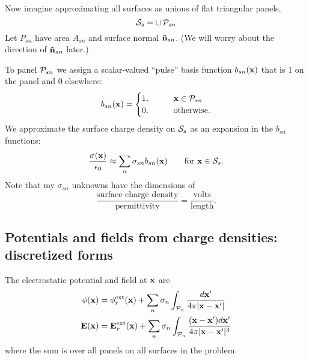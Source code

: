 \documentclass[letterpaper]{article}
\begin{document}
Now imagine approximating all surfaces as unions 
of flat triangular panels, 
$$ \mathcal{S}_{s} = \cup \, \mathcal{P}_{sn}$$
Let $P_{sn}$ have area $A_{sn}$ and surface normal
$\mathbf{\hat n}_{sn}$. (We will worry about the direction
of $\mathbf{\hat n}_{sn}$ later.)

To panel $\mathcal{P}_{sn}$ we assign a scalar-valued 
``pulse'' basis function $b_{sn}(\mathbf{x})$ that is 
1 on the panel and 0 elsewhere:
$$ b_{sn}(\mathbf{x}) = 
   \begin{cases}
    1, \qquad &\mathbf{x} \in \mathcal{P}_{sn} \\
    0, \qquad &\text{otherwise}.
  \end{cases}
$$
We approximate the surface charge density on $\mathcal{S}_s$
as an expansion in the $b_{sn}$ functions:
$$ \frac{\sigma(\mathbf{x})}{\epsilon_0} 
   \approx \sum_n \sigma_{sn} b_{sn}(\mathbf{x})
   \qquad 
   \text{for }\mathbf{x}\in \mathcal{S}_s.
$$
Note that my $\sigma_{sn}$ unknowns have the dimensions
of 
$$\frac{\text{surface charge density}}{\text{permittivity}}=
  \frac{\text{volts}}{\text{length}}.
$$

\subsection*{Potentials and fields from charge densities: 
             discretized forms} 

The electrostatic potential and field at $\mathbf{x}$ are 
\begin{subequations}
\begin{align}
\phi(\mathbf{x}) 
&= \phi_r^{\hbox{\scriptsize{ext}}}(\mathbf{x})
   +
   \sum_{n} \sigma_n 
   \int_{\mathcal{P}_n} \frac{d\mathbf{x}^\prime}{4\pi |\mathbf{x} - \mathbf{x}^\prime|}
\\
\mathbf{E}(\mathbf{x}) 
&= \mathbf{E}_r^{\hbox{\scriptsize{ext}}}(\mathbf{x})
   +
   \sum_{n} \sigma_n 
   \int_{\mathcal{P}_n} \frac{(\mathbf{x}-\mathbf{x}^\prime)d\mathbf{x}^\prime}
                       {4\pi |\mathbf{x} - \mathbf{x}^\prime|^3}
\end{align}
\label{DiscreteEquations1}
\end{subequations}
where the sum is over all panels on all surfaces in the problem.

\end{document}
